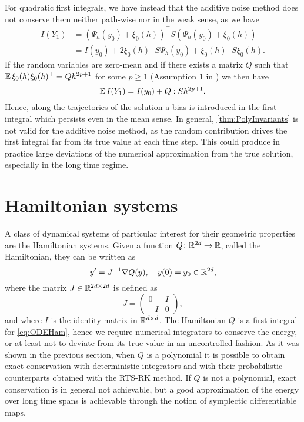 \documentclass[10pt]{article}
\begin{document}
For quadratic first integrals, we have instead that the additive noise method does not conserve them neither path-wise nor in the weak sense, as we have
\begin{equation}
\begin{aligned}
	I(Y_1) &= (\Psi_h(y_0) + \xi_0(h))^\top  S (\Psi_h(y_0) + \xi_0(h)) \\
	&= I(y_0) + 2\xi_0(h)^\top  S  \Psi_h(y_0) + \xi_0(h)^\top  S \xi_0(h).
\end{aligned}
\end{equation}
If the random variables are zero-mean and if there exists a matrix $Q$ such that $\operatorname{\mathbb{E}}\xi_0(h)\xi_0(h)^\top  = Qh^{2p + 1}$ for some $p \geq 1$ (Assumption 1 in \cite{CGS16}) we then have
\begin{equation}\label{eq:BiasQuadraticAddNoise}
\operatorname{\mathbb{E}} I(Y_1) = I(y_0) + Q : S h^{2p + 1}.
\end{equation}
Hence, along the trajectories of the solution a bias is introduced in the first integral which persists even in the mean sense. In general, \cref{thm:PolyInvariants} is not valid for the additive noise method, as the random contribution drives the first integral far from its true value at each time step. This could produce in practice large deviations of the numerical approximation from the true solution, especially in the long time regime.

\section{Hamiltonian systems}\label{sec:Hamiltonian} A class of dynamical systems of particular interest for their geometric properties are the Hamiltonian systems. Given a function $Q \colon \mathbb{R}^{2d} \to \mathbb{R}$, called the Hamiltonian, they can be written as
\begin{equation}\label{eq:ODEHam}
y' = J^{-1}\nabla Q(y), \quad y(0) = y_0 \in \mathbb{R}^{2d},
\end{equation}
where the matrix $J\in\mathbb{R}^{2d \times 2d}$ is defined as
\begin{equation}
J = \begin{pmatrix} 0 & I \\ -I & 0 \end{pmatrix},
\end{equation}
and where $I$ is the identity matrix in $\mathbb{R}^{d\times d}$. The Hamiltonian $Q$ is a first integral for \eqref{eq:ODEHam}, hence we require numerical integrators to conserve the energy, or at least not to deviate from its true value in an uncontrolled fashion. As it was shown in the previous section, when $Q$ is a polynomial it is possible to obtain exact conservation with deterministic integrators and with their probabilistic counterparts obtained with the RTS-RK method. If $Q$ is not a polynomial, exact conservation is in general not achievable, but a good approximation of the energy over long time spans is achievable through the notion of symplectic differentiable maps.
\end{document}
